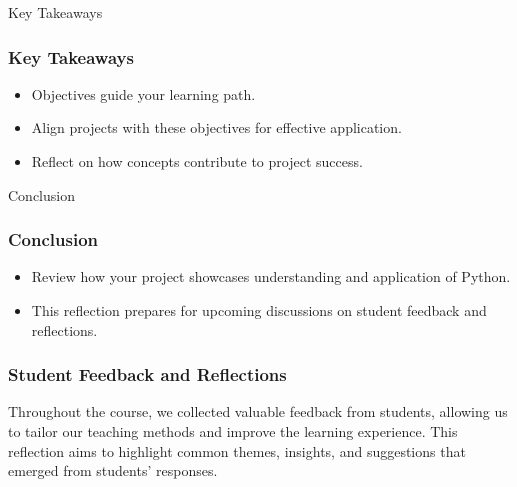 \documentclass{beamer}
\begin{document}
\begin{frame}{Key Takeaways}
    \frametitle{Key Takeaways}
    \begin{itemize}
        \item Objectives guide your learning path.
        \item Align projects with these objectives for effective application.
        \item Reflect on how concepts contribute to project success.
    \end{itemize}
\end{frame}

\begin{frame}{Conclusion}
    \frametitle{Conclusion}
    \begin{itemize}
        \item Review how your project showcases understanding and application of Python.
        \item This reflection prepares for upcoming discussions on student feedback and reflections.
    \end{itemize}
\end{frame}

\begin{frame}[fragile]
    \frametitle{Student Feedback and Reflections}
    Throughout the course, we collected valuable feedback from students, allowing us to tailor our teaching methods and improve the learning experience. This reflection aims to highlight common themes, insights, and suggestions that emerged from students' responses.
\end{frame}
\end{document}
